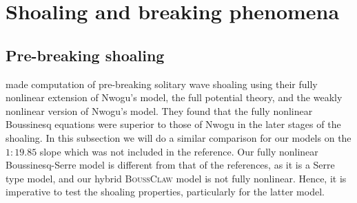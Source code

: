 \documentclass[review]{elsarticle}
\newcommand{\BoussClaw}{\textsc{BoussClaw} }
\begin{document}




\section{Shoaling and breaking phenomena}
\label{sec:shoaling_breaking}

\subsection{Pre-breaking shoaling}
\label{sec:num_shoaling}
\citet{wei1995fully} made computation of pre-breaking solitary wave shoaling using
 their fully nonlinear extension of Nwogu's model, the full potential 
theory, and the weakly nonlinear version of Nwogu's model.
They found that the fully nonlinear Boussinesq equations were superior to those of Nwogu in the later stages of the shoaling.
In this subsection we will do a similar comparison for our models on the $1:19.85$ slope which was not included in the reference. Our fully nonlinear Boussinesq-Serre model is different from that of the references, as it is a Serre type model, 
and our hybrid \BoussClaw model is not fully nonlinear. Hence, it is imperative
to test the shoaling properties, particularly for the latter model.   
 
\end{document}
